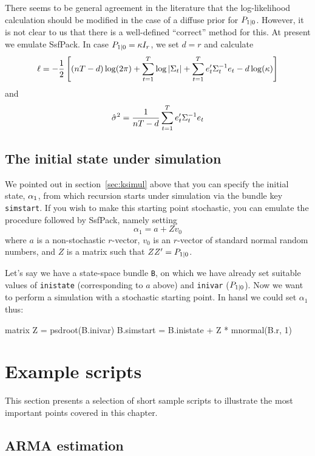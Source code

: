 There seems to be general agreement in the literature that the
log-likelihood calculation should be modified in the case of a diffuse
prior for $P_{1|0}$.  However, it is not clear to us that
there is a well-defined ``correct'' method for this.  At present we
emulate \textsf{SsfPack}.  In case
$P_{1|0} = \kappa I_r$, we set $d = r$ and calculate
%
\[
  \ell = -\frac{1}{2} \left[(nT-d) \log(2 \pi) + 
    \sum_{t=1}^T\log \left|\Sigma_t\right| + 
    \sum_{t=1}^Te_t'\Sigma_t^{-1} e_t
    - d \log(\kappa)
  \right]
\]
%
and
%
\[
\hat{\sigma}^2 = \frac{1}{nT-d} 
   \sum_{t=1}^Te_t'\Sigma_t^{-1} e_t
\]

\subsection{The initial state under simulation}
\label{sec:simstart}

We pointed out in section~\ref{sec:ksimul} above that you can specify
the initial state, $\alpha_1$, from which recursion starts under
simulation via the bundle key \texttt{simstart}. If you wish to make
this starting point stochastic, you can emulate the procedure followed
by \textsf{SsfPack}, namely setting
\[
\alpha_1 = a + Z v_0
\]
where $a$ is a non-stochastic $r$-vector, $v_0$ is an $r$-vector
of standard normal random numbers, and $Z$ is a matrix such
that $ZZ' = P_{1|0}$.

Let's say we have a state-space bundle \texttt{B}, on which we have
already set suitable values of \texttt{inistate} (corresponding to $a$
above) and \texttt{inivar} ($P_{1|0}$).  Now we want to
perform a simulation with a stochastic starting point. In hansl we
could set $\alpha_1$ thus:
%
\begin{code}
matrix Z = psdroot(B.inivar)
B.simstart = B.inistate + Z * mnormal(B.r, 1)
\end{code}

\section{Example scripts}
\label{sec:ss-examples}

This section presents a selection of short sample scripts to
illustrate the most important points covered in this chapter.

\subsection{ARMA estimation}
\label{sec:example_arma}

